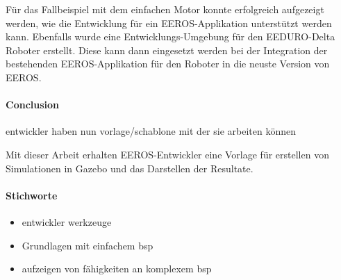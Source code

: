 Für das Fallbeispiel mit dem einfachen Motor konnte erfolgreich aufgezeigt werden, wie die Entwicklung für ein EEROS-Applikation unterstützt werden kann.
Ebenfalls wurde eine Entwicklungs-Umgebung für den EEDURO-Delta Roboter erstellt.
Diese kann dann eingesetzt werden bei der Integration der bestehenden EEROS-Applikation für den Roboter in die neuste Version von EEROS.

\paragraph*{Conclusion}
entwickler haben nun vorlage/schablone mit der sie arbeiten können

Mit dieser Arbeit erhalten EEROS-Entwickler eine Vorlage für erstellen von Simulationen in Gazebo und das Darstellen der Resultate.

\paragraph*{Stichworte}
\begin{itemize}
\item entwickler werkzeuge
\item Grundlagen mit einfachem bsp
\item aufzeigen von fähigkeiten an komplexem bsp
\end{itemize}